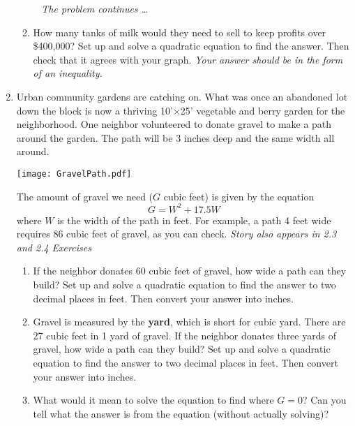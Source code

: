 \begin{enumerate}
\begin{enumerate}
\newpage %
~\hspace{-.5in} \emph{The problem continues \ldots}

\item How many tanks of milk would they need to sell to keep profits over \$400,000?  Set up and solve a quadratic equation to find the answer.  Then check that it agrees with your graph.   \emph{Your answer should be in the form of an inequality.} \vfill
\end{enumerate}

\newpage %

 \item Urban community gardens are catching on.  What was once an abandoned lot down the block is now a thriving 10'$\times$25' vegetable and berry garden for the neighborhood. One neighbor  volunteered to donate  gravel to make a path around the garden.  The path will be 3 inches deep and the same width all around.   
\begin{center}
\scalebox {.4} {\texttt{[image: GravelPath.pdf]}}
\end{center}
The amount of gravel we need ($G$ cubic feet) is given by the equation  $$G = W^2 + 17.5W$$
where $W$ is the width of the path in feet.  For example, a path 4 feet wide requires 86 cubic feet of gravel, as you can check.
\hfill \emph{Story also appears in 2.3 and 2.4 Exercises}
\begin{enumerate}
\item  If the neighbor donates 60 cubic feet of gravel, how wide a path can they build?  Set up and solve a quadratic equation to find the answer to two decimal places in feet. Then convert your answer into inches. \vfill
\item Gravel is measured by the \textbf{yard}, which is short for cubic yard.  There are 27 cubic feet in 1 yard of gravel.  If the neighbor donates three yards of gravel, how wide a path can they build? Set up and solve a quadratic equation to find the answer to two decimal places in feet. Then convert your answer into inches. \vfill
\item What would it mean to solve the equation to find where $G=0$?  Can you tell what the answer is from the equation (without actually solving)? \bigskip
\end{enumerate}

\end{enumerate}



